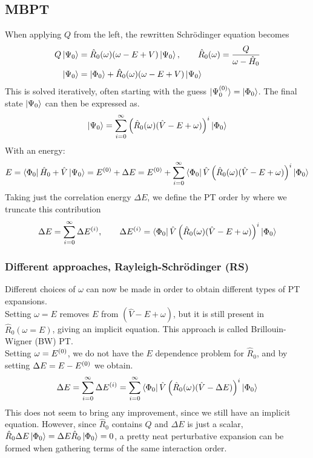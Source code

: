 \documentclass[
11pt,notheorems,hyperref={pdfauthor=whatever}
]{beamer}
\begin{document}
\subsection{MBPT}
\begin{frame}
    When applying $Q$ from the left, the rewritten Schr\"{o}dinger equation becomes
    \begin{align*}
        Q\ket{\Psi_0} &= \hat{R}_0(\omega) (\omega - E + V)\ket{\Psi_0}, \hspace{20px} \hat{R}_0 (\omega) = \frac{Q}{\omega-\hat{H}_0} \\
        \ket{\Psi_0} &= \gs + \hat{R}_0(\omega) (\omega - E + V)\ket{\Psi_0}
    \end{align*}
    This is solved iteratively, often starting with the guess $\ket{\Psi_0^{(0)}} = \ket{\Phi_0}$. The final state $\ket{\Psi_0}$ can then be expressed as. 
    \begin{align*}
        \ket{\Psi_0} = \sum_{i=0}^\infty \left( \hat{R}_0(\omega) (\hat{V}-E+\omega) \right)^i \ket{\Phi_0}
    \end{align*}
    With an energy:
    \begin{align*}
        E = \bra{\Phi_0}\hat{H}_0 + \hat{V}\ket{\Psi_0}= E^{(0)} + \Delta E = E^{(0)} +  \sum_{i=0}^\infty  \bra{\Phi_0} \hat{V}\left( \hat{R}_0(\omega) (\hat{V}-E+\omega) \right)^i \ket{\Phi_0}    
    \end{align*}
    Taking just the correlation energy $\Delta E$, we define the PT order by where we truncate this contribution
    \begin{align*}
        \Delta E = \sum_{i=0}^\infty \ord{\Delta E}{i},\hspace{20px} \ord{\Delta E}{i} = \bra{\Phi_0} \hat{V}\left( \hat{R}_0(\omega) (\hat{V}-E+\omega) \right)^i \gs
    \end{align*}
\end{frame}

\begin{frame}
    \frametitle{Different approaches, Rayleigh-Schr\"{o}dinger (RS)}
    Different choices of $\omega$ can now be made in order to obtain diﬀerent types of PT expansions. 
    \\[10pt]
    Setting $\omega = E$ removes $E$ from $(\hat{V}-E+\omega)$, but it is still present in $\hat{R}_0(\omega = E)$, giving an implicit equation. This approach is called Brillouin-Wigner (BW) PT.
    \\[10pt] Setting $\omega = E^{(0)}$, we do not have the $E$ dependence problem for $\hat{R}_0$, and by setting $\Delta E = E - E^{(0)}$ we obtain.
    \begin{align*}
        \Delta E = \sum_{i=0}^\infty \Delta E^{(i)} = \sum_{i=0}^\infty \bra{\Phi_0} \hat{V}\left( \hat{R}_0(\omega) (\hat{V}-\Delta E) \right)^i \ket{\Phi_0}
    \end{align*}
    This does not seem to bring any improvement, since we still have an implicit equation. However, since $\hat{R}_0$ contains $Q$ and $\Delta E$ is just a scalar, $\hat{R}_0 \Delta E \ket{\Phi_0} = \Delta E \hat{R}_0 \ket{\Phi_0} = 0$, a pretty neat perturbative expansion can be formed when gathering terms of the same interaction order. 
\end{frame}
\end{document}
